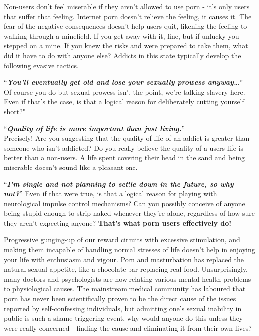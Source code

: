 \documentclass[
]{book}
\begin{document}
Non-users don't feel miserable if they aren't allowed to use porn - it's only users that suffer that feeling. Internet porn doesn't relieve the feeling, it causes it. The fear of the negative consequences doesn't help users quit, likening the feeling to walking through a minefield. If you get away with it, fine, but if unlucky you stepped on a mine. If you knew the risks and were prepared to take them, what did it have to do with anyone else? Addicts in this state typically develop the following evasive tactics.

``\textbf{\emph{You'll eventually get old and lose your sexually prowess anyway\ldots{}}}''\\
Of course you do but sexual prowess isn't the point, we're talking slavery here. Even if that's the case, is that a logical reason for deliberately cutting yourself short?"

``\textbf{\emph{Quality of life is more important than just living.}}''\\
Precisely! Are you suggesting that the quality of life of an addict is greater than someone who isn't addicted? Do you really believe the quality of a users life is better than a non-users. A life spent covering their head in the sand and being miserable doesn't sound like a pleasant one.

``\textbf{\emph{I'm single and not planning to settle down in the future, so why not?}}''
Even if that were true, is that a logical reason for playing with neurological impulse control mechanisms? Can you possibly conceive of anyone being stupid enough to strip naked whenever they're alone, regardless of how sure they aren't expecting anyone? \textbf{That's what porn users effectively do!}

Progressive gunging-up of our reward circuits with excessive stimulation, and making them incapable of handling normal stresses of life doesn't help in enjoying your life with enthusiasm and vigour. Porn and masturbation has replaced the natural sexual appetite, like a chocolate bar replacing real food. Unsurprisingly, many doctors and psychologists are now relating various mental health problems to physiological causes. The mainstream medical community has laboured that porn has never been scientifically proven to be the direct cause of the issues reported by self-confessing individuals, but admitting one's sexual inability in public is such a shame triggering event, why would anyone do this unless they were really concerned - finding the cause and eliminating it from their own lives?
\end{document}
